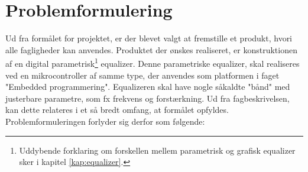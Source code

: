 \section{Problemformulering}
%
%


%
Ud fra formålet for projektet, er der blevet valgt at fremstille et produkt, hvori alle fagligheder kan anvendes. 
Produktet der ønskes realiseret, er konstruktionen af en digital parametrisk\footnote{Uddybende forklaring om forskellen mellem parametrisk og grafisk equalizer sker i kapitel \ref{kap:equalizer}.} equalizer. 
Denne parametriske equalizer, skal realiseres ved en mikrocontroller af samme type, der anvendes som platformen i faget "Embedded programmering".
Equalizeren skal have nogle såkaldte "bånd" med justerbare parametre, som fx frekvens og forstærkning. 
Ud fra fagbeskrivelsen, kan dette relateres i et så bredt omfang, at formålet opfyldes. 
Problemformuleringen forlyder sig derfor som følgende: \\

